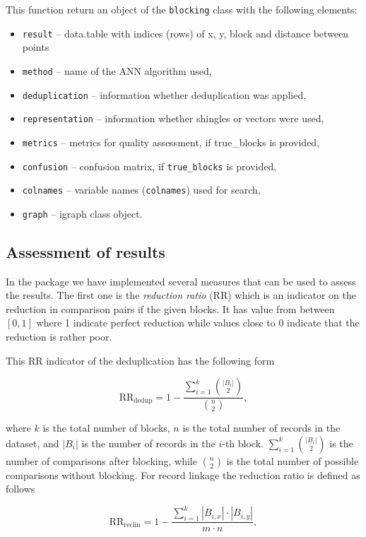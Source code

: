 This function return an object of the \texttt{blocking} class with the
following elements:

\begin{itemize}
\tightlist
\item
  \texttt{result} -- data.table with indices (rows) of x, y, block and
  distance between points
\item
  \texttt{method} -- name of the ANN algorithm used,
\item
  \texttt{deduplication} -- information whether deduplication was applied,
\item
  \texttt{representation} -- information whether shingles or vectors were
  used,
\item
  \texttt{metrics} -- metrics for quality assessment, if true\_blocks is
  provided,
\item
  \texttt{confusion} -- confusion matrix, if \texttt{true\_blocks} is provided,
\item
  \texttt{colnames} -- variable names (\texttt{colnames}) used for search,
\item
  \texttt{graph} -- igraph class object.
\end{itemize}

\subsection{Assessment of results}\label{sec-assess}

In the package we have implemented several measures that can be used to
assess the results. The first one is the \emph{reduction ratio} (RR) which is
an indicator on the reduction in comparison pairs if the given blocks.
It has value from between \([0,1]\) where 1 indicate perfect reduction
while values close to 0 indicate that the reduction is rather poor.

This RR indicator of the deduplication has the following form

\[
\text{RR}_{\text{dedup}} = 1 - \frac{\sum\limits_{i=1}^{k} \binom{|B_i|}{2}}{\binom{n}{2}},
\]

\noindent where \(k\) is the total number of blocks, \(n\) is the total
number of records in the dataset, and \(|B_i|\) is the number of records
in the \(i\)-th block. \(\sum\limits_{i=1}^{k} \binom{|B_i|}{2}\) is the
number of comparisons after blocking, while \(\binom{n}{2}\) is the total
number of possible comparisons without blocking. For record linkage the
reduction ratio is defined as follows

\[
\text{RR}_{\text{reclin}} = 1 - \frac{\sum\limits_{i=1}^{k} |B_{i,x}| \cdot |B_{i,y}|} {m \cdot n},
\]

